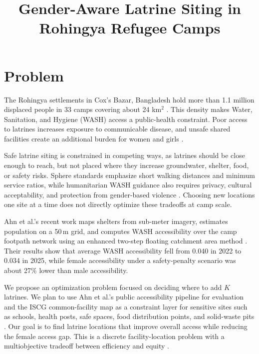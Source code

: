\documentclass[twoside,11pt]{article}
\begin{document}
\title{Gender-Aware Latrine Siting in Rohingya Refugee Camps}
\newcommand{\shorttitle}{Rohingya Latrine Siting}

\maketitle

\section{Problem}

The Rohingya settlements in Cox's Bazar, Bangladesh hold more than 1.1 million displaced people in 33 camps covering about 24 km$^2$ \cite{arxiv}. This density makes Water, Sanitation, and Hygiene (WASH) access a public-health constraint. Poor access to latrines increases exposure to communicable disease, and unsafe shared facilities create an additional burden for women and girls \cite{arxiv}.

Safe latrine siting is constrained in competing ways, as latrines should be close enough to reach, but not placed where they increase groundwater, shelter, food, or safety risks. Sphere standards emphasize short walking distances and minimum service ratios, while humanitarian WASH guidance also requires privacy, cultural acceptability, and protection from gender-based violence \cite{Sphere_Association2018-uu,United_Nations_High_Commissioner_for_Refugees2026-jk}. Choosing new locations one site at a time does not directly optimize these tradeoffs at camp scale.

Ahn et al.'s recent work maps shelters from sub-meter imagery, estimates population on a 50\,m grid, and computes WASH accessibility over the camp footpath network using an enhanced two-step floating catchment area method \cite{arxiv}. Their results show that average WASH accessibility fell from 0.040 in 2022 to 0.034 in 2025, while female accessibility under a safety-penalty scenario was about 27\% lower than male accessibility.

We propose an optimization problem focused on deciding where to add $K$ latrines. We plan to use Ahn et al.'s public accessibility pipeline for evaluation and the ISCG common-facility map as a constraint layer for sensitive sites such as schools, health posts, safe spaces, food distribution points, and solid-waste pits \cite{coxbazar-dataset}. Our goal is to find latrine locations that improve overall access while reducing the female access gap. This is a discrete facility-location problem with a multiobjective tradeoff between efficiency and equity \cite{Toregas1971-uy,Church1974-sz,Farahani2012-sq}.
\end{document}
